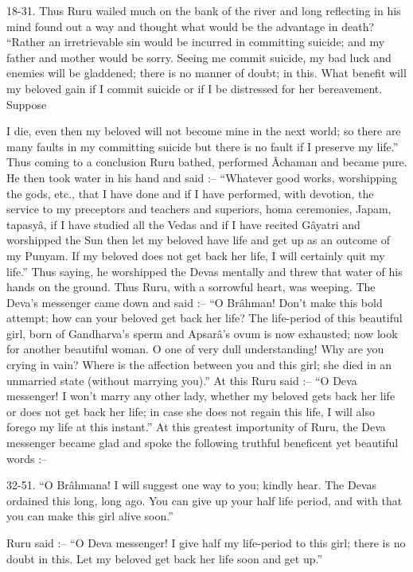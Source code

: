 18-31. Thus Ruru wailed much on the bank of the river and long reflecting in his mind found out a way and thought what would be the advantage in death? ``Rather an irretrievable sin would be incurred in committing suicide; and my father and mother would be sorry. Seeing me commit suicide, my bad luck and enemies will be gladdened; there is no manner of doubt; in this. What benefit will my beloved gain if I commit suicide or if I be distressed for her bereavement. Suppose

I die, even then my beloved will not become mine in the next world; so there are many faults in my committing suicide but there is no fault if I preserve my life.'' Thus coming to a conclusion Ruru bathed, performed Âchaman and became pure. He then took water in his hand and said :-- ``Whatever good works, worshipping the gods, etc., that I have done and if I have performed, with devotion, the service to my preceptors and teachers and superiors, homa ceremonies, Japam, tapasy\^a, if I have studied all the Vedas and if I have recited G\^ayatri and worshipped the Sun then let my beloved have life and get up as an outcome of my Punyam. If my beloved does not get back her life, I will certainly quit my life.'' Thus saying, he worshipped the Devas mentally and threw that water of his hands on the ground. Thus Ruru, with a sorrowful heart, was weeping. The Deva's messenger came down and said :-- ``O Br\^ahman! Don't make this bold attempt; how can your beloved get back her life? The life-period of this beautiful girl, born of Gandharva's sperm and Apsar\^a's ovum is now exhausted; now look for another beautiful woman. O one of very dull understanding! Why are you crying in vain? Where is the affection between you and this girl; she died in an unmarried state (without marrying you).'' At this Ruru said :-- ``O Deva messenger! I won't marry any other lady, whether my beloved gets back her life or does not get back her life; in case she does not regain this life, I will also forego my life at this instant.'' At this greatest importunity of Ruru, the Deva messenger became glad and spoke the following truthful beneficent yet beautiful words :--

32-51. ``O Br\^ahmana! I will suggest one way to you; kindly hear. The Devas ordained this long, long ago. You can give up your half life period, and with that you can make this girl alive soon.''

Ruru said :-- ``O Deva messenger! I give half my life-period to this girl; there is no doubt in this. Let my beloved get back her life soon and get up.''


